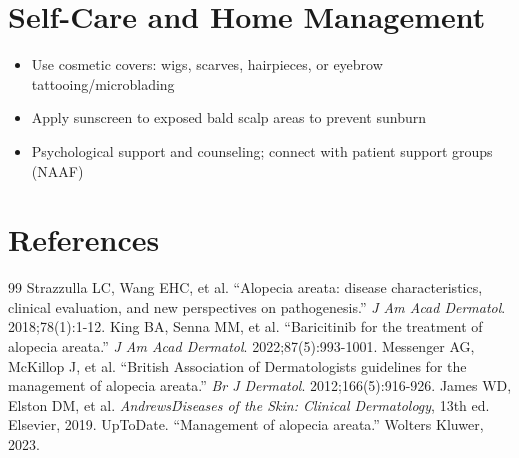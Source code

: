 \section*{Self-Care and Home Management}
\begin{itemize}
 \item Use cosmetic covers: wigs, scarves, hairpieces, or eyebrow tattooing/microblading
 \item Apply sunscreen to exposed bald scalp areas to prevent sunburn
 \item Psychological support and counseling; connect with patient support groups (NAAF)
\end{itemize}

\section*{References}
\begin{thebibliography}{99}
 Strazzulla LC, Wang EHC, et al. ``Alopecia areata: disease characteristics, clinical evaluation, and new perspectives on pathogenesis.'' \textit{J Am Acad Dermatol}. 2018;78(1):1-12.
 King BA, Senna MM, et al. ``Baricitinib for the treatment of alopecia areata.'' \textit{J Am Acad Dermatol}. 2022;87(5):993-1001.
 Messenger AG, McKillop J, et al. ``British Association of Dermatologists guidelines for the management of alopecia areata.'' \textit{Br J Dermatol}. 2012;166(5):916-926.
 James WD, Elston DM, et al. \textit{Andrews\' Diseases of the Skin: Clinical Dermatology}, 13th ed. Elsevier, 2019.
 UpToDate. ``Management of alopecia areata.'' Wolters Kluwer, 2023.
\end{thebibliography}
